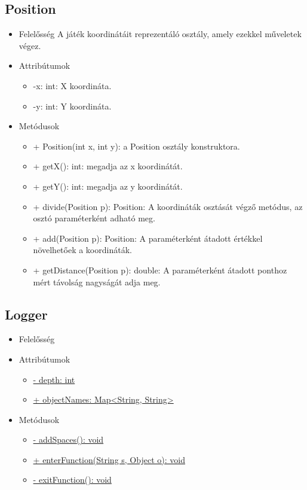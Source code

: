 \subsection{Position}
\begin{itemize}
	\item Felelősség
	A játék koordinátáit reprezentáló osztály, amely ezekkel műveletek végez.
	\item Attribútumok
	\begin{itemize}
		\item -x: int: X koordináta.
		\item -y: int: Y koordináta.
	\end{itemize}
	\item Metódusok
	\begin{itemize}
		\item + Position(int x, int y): a Position osztály konstruktora.
		\item + getX(): int: megadja az x koordinátát.
		\item + getY(): int: megadja az y koordinátát.
		\item + divide(Position p): Position: A koordináták osztását végző metódus, az osztó paraméterként adható meg.
		\item + add(Position p): Position: A paraméterként átadott értékkel növelhetőek a koordináták.
		\item + getDistance(Position p): double: A paraméterként átadott ponthoz mért távolság nagyságát adja meg.
	\end{itemize}
\end{itemize}

\subsection{Logger}
\begin{itemize}
	\item Felelősség\newline

	\item Attribútumok\newline
	
	\begin{itemize}
		\item \underline{- depth: int}
		\item \underline{+ objectNames: Map<String, String>}
	\end{itemize}
	\item Metódusok
	\begin{itemize}
		\item \underline{- addSpaces(): void}
		\item \underline{+ enterFunction(String s, Object o): void}
		\item \underline{- exitFunction(): void}
	\end{itemize}
\end{itemize}

